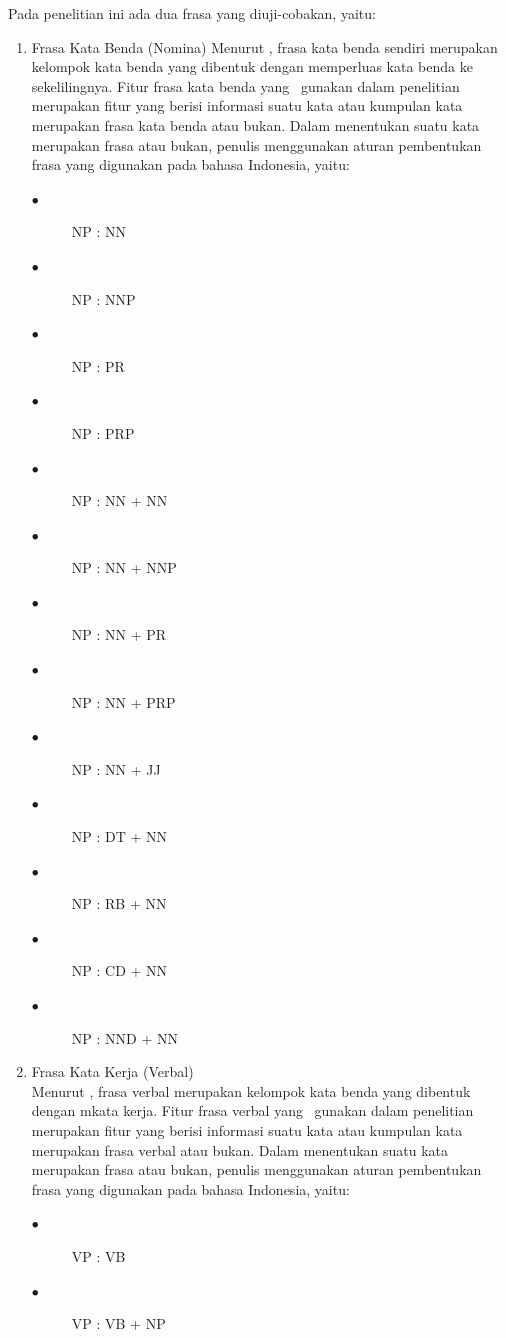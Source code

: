 \begin{enumerate}
	Pada penelitian ini ada dua frasa yang diuji-cobakan, yaitu:
	\begin{enumerate}
		\item Frasa Kata Benda (Nomina)
		Menurut \cite{hs2005bahasa}, frasa kata benda sendiri merupakan kelompok kata benda yang dibentuk dengan memperluas kata benda ke sekelilingnya. Fitur frasa kata benda yang \saya~gunakan dalam penelitian merupakan fitur yang berisi informasi suatu kata atau kumpulan kata merupakan frasa kata benda atau bukan. Dalam menentukan suatu kata merupakan frasa atau bukan, penulis menggunakan aturan pembentukan frasa yang digunakan pada bahasa Indonesia, yaitu:
		\begin{description}
			\item[$\bullet$] NP : NN
			\item[$\bullet$] NP : NNP
			\item[$\bullet$] NP : PR
			\item[$\bullet$] NP : PRP
			\item[$\bullet$] NP : NN + NN
			\item[$\bullet$] NP : NN + NNP
			\item[$\bullet$] NP : NN + PR
			\item[$\bullet$] NP : NN + PRP
			\item[$\bullet$] NP : NN + JJ
			\item[$\bullet$] NP : DT + NN
			\item[$\bullet$] NP : RB + NN
			\item[$\bullet$] NP : CD + NN
			\item[$\bullet$] NP : NND + NN
		\end{description}
		
		\item Frasa Kata Kerja (Verbal)\\
		Menurut \cite{hs2005bahasa}, frasa verbal merupakan kelompok kata benda yang dibentuk dengan mkata kerja. Fitur frasa verbal yang \saya~gunakan dalam penelitian merupakan fitur yang berisi informasi suatu kata atau kumpulan kata merupakan frasa verbal atau bukan. Dalam menentukan suatu kata merupakan frasa atau bukan, penulis menggunakan aturan pembentukan frasa yang digunakan pada bahasa Indonesia, yaitu:
		\begin{description}
			\item[$\bullet$] VP : VB
			\item[$\bullet$] VP : VB + NP
		\end{description}
	\end{enumerate}


\end{enumerate}

